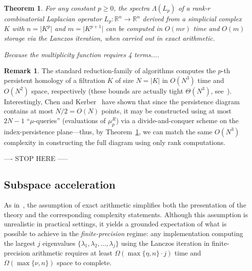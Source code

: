 \documentclass[10pt]{article}
\numberwithin{equation}{section}
\newcommand{\+}{%
	\raisebox{0.18ex}{\scaleobj{0.55}{+}}
}
\newtheorem{theorem}{Theorem}
\theoremstyle{definition}
\newtheorem{remark}{Remark}
\theoremstyle{definition}
\begin{document}
\begin{theorem}\label{prop:spectral_rank_complexity}
	For any constant $p \geq 0$, the spectra $\Lambda(L_p)$ of a rank-$r$ combinatorial Laplacian operator $L_p: \mathbb{R}^n \to \mathbb{R}^n$ derived from a simplicial complex $K$ with $n = \lvert K^p \rvert$ and $m = \lvert K^{p+1} \rvert$ can be computed in $O(mr)$ time and $O(m)$ storage via the Lanczos iteration, when carried out in exact arithmetic. 
	
	Because the multiplicity function requires 4 terms.... 
\end{theorem}

\begin{remark}
	The standard reduction-family of algorithms computes the $p$-th persistent homology of a filtration $K$ of size $N = \lvert K \rvert$ in $O(N^3)$ time and $O(N^2)$ space, respectively (these bounds are actually tight $\Theta(N^3)$, see~\cite{}). 
	Interestingly, Chen and Kerber~\cite{chen2011output} have shown that since the persistence diagram contains at most $N/2 = O(N)$ points, it may be constructed using at most $2N - 1$ ``$\mu$-queries'' (evaluations of $\mu_p^R$) via a divide-and-conquer scheme on the index-persistence plane---thus, by Theorem~\ref{prop:spectral_rank_complexity}, we can match the same $O(N^3)$ complexity in constructing the full diagram using only rank computations.  
\end{remark}

---- STOP HERE ----- 

\subsection*{Subspace acceleration}
\noindent As in~\cite{parlett1994we}, the assumption of exact arithmetic simplifies both the presentation of the theory and the corresponding complexity statements. 
Although this assumption is unrealistic in practical settings, it yields a grounded expectation of what is possible to achieve in the \emph{finite-precision} regime: any implementation computing the largest $j$ eigenvalues $\{ \lambda_1, \lambda_2, \dots, \lambda_j \}$ using the Lanczos iteration in finite-precision arithmetic requires at least $\Omega(\max\{\eta, n\} \cdot j)$ time and $\Omega(\max\{\nu, n\})$ space to complete. 
\end{document}
